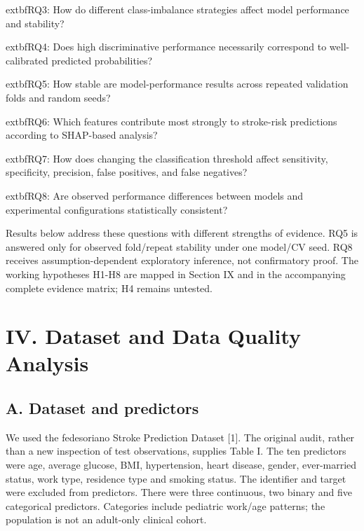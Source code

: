 \documentclass[10pt,twocolumn,letterpaper]{article}
\begin{document}
	extbf{RQ3:} How do different class-imbalance strategies affect model performance and stability?


	extbf{RQ4:} Does high discriminative performance necessarily correspond to well-calibrated predicted probabilities?


	extbf{RQ5:} How stable are model-performance results across repeated validation folds and random seeds?


	extbf{RQ6:} Which features contribute most strongly to stroke-risk predictions according to SHAP-based analysis?


	extbf{RQ7:} How does changing the classification threshold affect sensitivity, specificity, precision, false positives, and false negatives?


	extbf{RQ8:} Are observed performance differences between models and experimental configurations statistically consistent?


Results below address these questions with different strengths of evidence. RQ5 is answered only for observed fold/repeat stability under one model/CV seed. RQ8 receives assumption-dependent exploratory inference, not confirmatory proof. The working hypotheses H1-H8 are mapped in Section IX and in the accompanying complete evidence matrix; H4 remains untested.


\section*{IV. Dataset and Data Quality Analysis}
\subsection*{A. Dataset and predictors}
We used the fedesoriano Stroke Prediction Dataset [1]. The original audit, rather than a new inspection of test observations, supplies Table I. The ten predictors were age, average glucose, BMI, hypertension, heart disease, gender, ever-married status, work type, residence type and smoking status. The identifier and target were excluded from predictors. There were three continuous, two binary and five categorical predictors. Categories include pediatric work/age patterns; the population is not an adult-only clinical cohort.
\end{document}
